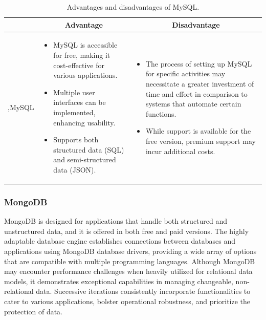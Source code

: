 \begin{table}[H]
    \centering
    \begin{tabular}{| c | p{} | p{} |}
        \hline
        \multicolumn{1}{|c|}{}
        & \multicolumn{1}{c|}{Advantage}
        & \multicolumn{1}{c|}{Disadvantage} \\ \hline
        \multirow{7}{*}{,MySQL}     
                &   \begin{itemize}[leftmargin=*,topsep=0pt,partopsep=0pt,parsep=0pt]
                        \item MySQL is accessible for free, making it cost-effective for various applications.
                        \item Multiple user interfaces can be implemented, enhancing usability.
                        \item Supports both structured data (SQL) and semi-structured data (JSON).
                    \end{itemize}
                &   \begin{itemize}[leftmargin=*,topsep=0pt,partopsep=0pt,parsep=0pt]
                        \item The process of setting up MySQL for specific activities may necessitate a greater investment of time and effort in comparison to systems that automate certain functions.
                        \item While support is available for the free version, premium support may incur additional costs.
                    \end{itemize} \\ \hline
    \end{tabular}
    \caption{Advantages and disadvantages of MySQL.}
\end{table}

\subsubsection{MongoDB}

MongoDB is designed for applications that handle both structured and unstructured data, and it is offered in both free and paid versions. The highly adaptable database engine establishes connections between databases and applications using MongoDB database drivers, providing a wide array of options that are compatible with multiple programming languages. Although MongoDB may encounter performance challenges when heavily utilized for relational data models, it demonstrates exceptional capabilities in managing changeable, non-relational data. Successive iterations consistently incorporate functionalities to cater to various applications, bolster operational robustness, and prioritize the protection of data.

